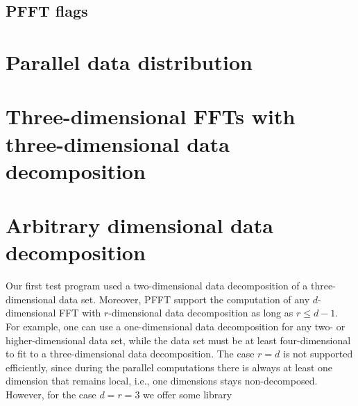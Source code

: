 \subsection{PFFT flags}
\begin{compactitem}
  \item {}
  \item {}
  \item {}
  \item {}
  \item {}
  \item {}
  \item {}
  \item {}
  \item {}
  \item {}
  \item {}
  \item {}
  \item {}
\end{compactitem}


\section{Parallel data distribution}

\section{Three-dimensional FFTs with three-dimensional data decomposition}

\section{Arbitrary dimensional data decomposition}
Our first test program used a two-dimensional data decomposition of a three-dimensional data set.
Moreover, PFFT support the computation of any $d$-dimensional FFT with $r$-dimensional data decomposition
as long as $r\le d-1$. For example, one can use a one-dimensional data decomposition for any two- or higher-dimensional data set,
while the data set must be at least four-dimensional to fit to a three-dimensional data decomposition.
The case $r=d$ is not supported efficiently, since during the parallel computations
there is always at least one dimension that remains local, i.e., one dimensions stays non-decomposed.
However, for the case $d=r=3$ we offer some library

